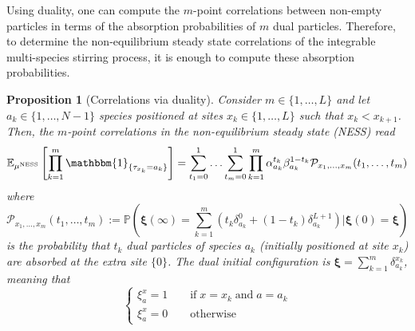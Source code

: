 \documentclass[10pt]{article}
\numberwithin{equation}{section}
\numberwithin{equation}{subsection}
\newtheorem{proposition}{Proposition}
\newcommand{\dt}{\;.}
\begin{document}
Using duality, one can compute the  $m$-point correlations between non-empty particles in terms of the absorption probabilities of $m$ dual particles. Therefore, to determine the non-equilibrium steady state correlations of the integrable multi-species stirring process, it is enough to compute these absorption probabilities.  %
\begin{proposition}[Correlations via duality]
\label{prop-absorbing}
Consider $m\in \{1,\ldots,L\}$ and let $a_{k}\in\{1,\ldots,N-1\}$ species positioned at sites $x_{k}\in\{1,\ldots,L\}$ such that $x_{k}<x_{k+1}$. Then, the $m$-point correlations in the non-equilibrium steady state (NESS) read
\begin{equation}
\mathbb{E}_{\mu^{\text{NESS}}}\left[\prod_{k=1}^{m}\mathbbm{1}_{\{\tau_{x_{k}}=a_{k}\}}\right]=\sum_{t_{1}=0}^{1}\ldots \sum_{t_{m}=0}^{1}\prod_{k=1}^{m}\alpha_{a_{k}}^{t_{k}}\beta_{a_{k}}^{1-t_{k}}\mathcal{P}_{x_1,\ldots,x_m}(t_{1},\ldots,t_{m})
\end{equation}
where
\begin{equation}\label{absProbabilitiesIntegrable}
	\mathcal{P}_{x_1,\ldots,x_m}(t_{1},\ldots,t_{m}):=\mathbb{P}\left(\bm{\xi}(\infty)=\sum_{k=1}^{m}\left(t_{k}\delta^{0}_{a_k}+(1-t_{k})\delta^{L+1}_{a_k}\right)\lvert \bm{\xi}(0)=\bm{\xi}\right)
\end{equation}
is the  probability that  $t_{k}$ dual particles of species $a_{k}$ (initially positioned at site $x_{k}$) are absorbed at the extra site $\{0\}$. The dual initial configuration is $\bm{\xi}=\sum_{k=1}^{m}\delta_{a_{k}}^{x_{k}}$, meaning that 
\begin{equation}
\label{xsi-init}
	\begin{cases}
		\xi_{a}^{x}=1\qquad \text{if}\;x=x_{k}\;\text{and}\; a=a_{k}\\
		\xi_{a}^{x}=0\qquad \text{otherwise}
	\end{cases}
\end{equation}
\end{proposition}
\end{document}
